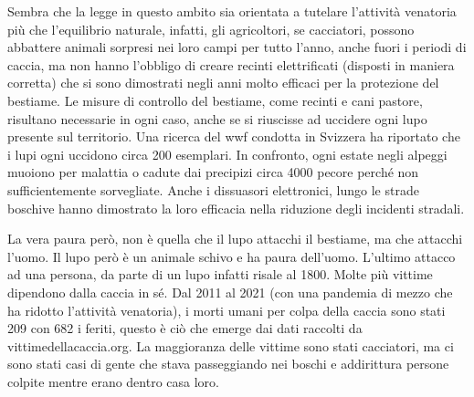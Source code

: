 \documentclass[12pt]{book} %
\begin{document}
\begin{mdframed}[linewidth=1pt]
Sembra che la legge in questo ambito sia orientata a tutelare l'attività venatoria più che
l'equilibrio naturale, infatti, gli agricoltori, se cacciatori, possono abbattere animali sorpresi
nei loro campi per tutto l'anno, anche fuori i periodi di caccia, ma non hanno
l'obbligo di creare recinti elettrificati (disposti in maniera corretta) che si sono dimostrati
negli anni molto efficaci per la protezione del bestiame. Le misure di controllo del bestiame, come recinti e cani
pastore, risultano necessarie in ogni caso, anche se si riuscisse ad uccidere ogni lupo presente sul territorio. Una
ricerca del wwf condotta in Svizzera ha riportato che i lupi ogni uccidono circa 200 esemplari. In confronto, ogni
estate negli alpeggi muoiono per malattia o cadute dai precipizi circa 4000 pecore perché non sufficientemente
sorvegliate. Anche i dissuasori elettronici, lungo le strade boschive hanno dimostrato la loro efficacia nella
riduzione degli incidenti stradali.

La vera paura però, non è quella che il lupo attacchi il bestiame, ma che attacchi l'uomo. Il lupo
però è un animale schivo e ha paura dell'uomo. L'ultimo attacco ad una
persona, da parte di un lupo infatti risale al 1800. Molte più vittime dipendono dalla caccia in sé. Dal 2011 al 2021
(con una pandemia di mezzo che ha ridotto l'attività venatoria), i morti umani per colpa della
caccia sono stati 209 con 682 i feriti, questo è ciò che emerge dai dati raccolti da vittimedellacaccia.org. La
maggioranza delle vittime sono stati cacciatori, ma ci sono stati casi di gente che stava passeggiando nei boschi e
addirittura persone colpite mentre erano dentro casa loro. 
\end{mdframed}
\end{document}
